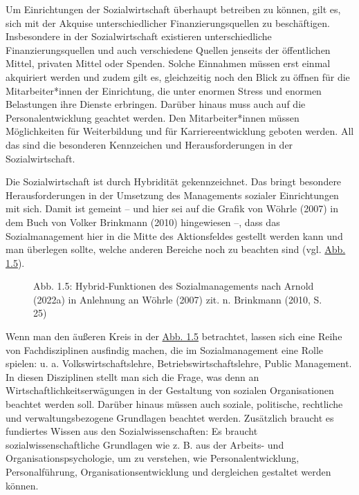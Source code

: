 \documentclass[
  letterpaper,
]{book}
\makeatletter
\newcommand*\pandocbounded[1]{%
  \sbox\pandoc@box{#1}%
  \Gscale@div\@tempa{\textheight}{\dimexpr\ht\pandoc@box+\dp\pandoc@box\relax}%
  \Gscale@div\@tempb{\linewidth}{\wd\pandoc@box}%
  \ifdim\@tempb\p@<\@tempa\p@\let\@tempa\@tempb\fi%
  \ifdim\@tempa\p@<\p@\scalebox{\@tempa}{\usebox\pandoc@box}%
  \else\usebox{\pandoc@box}%
  \fi%
}
\makeatother
\begin{document}
Um Einrichtungen der Sozialwirtschaft überhaupt betreiben zu können,
gilt es, sich mit der Akquise unterschiedlicher Finanzierungsquellen zu
beschäftigen. Insbesondere in der Sozialwirtschaft existieren
unterschiedliche Finanzierungsquellen und auch verschiedene Quellen
jenseits der öffentlichen Mittel, privaten Mittel oder Spenden. Solche
Einnahmen müssen erst einmal akquiriert werden und zudem gilt es,
gleichzeitig noch den Blick zu öffnen für die Mitarbeiter*innen der
Einrichtung, die unter enormen Stress und enormen Belastungen ihre
Dienste erbringen. Darüber hinaus muss auch auf die Personalentwicklung
geachtet werden. Den Mitarbeiter*innen müssen Möglichkeiten für
Weiterbildung und für Karriereentwicklung geboten werden. All das sind
die besonderen Kennzeichen und Herausforderungen in der
Sozialwirtschaft.

Die Sozialwirtschaft ist durch Hybridität gekennzeichnet. Das bringt
besondere Herausforderungen in der Umsetzung des Managements sozialer
Einrichtungen mit sich. Damit ist gemeint -- und hier sei auf die Grafik
von Wöhrle (2007) in dem Buch von Volker Brinkmann (2010) hingewiesen
--, dass das Sozialmanagement hier in die Mitte des Aktionsfeldes
gestellt werden kann und man überlegen sollte, welche anderen Bereiche
noch zu beachten sind (vgl. \hyperref[figure15]{Abb. 1.5}).

\begin{figure}

\pandocbounded{\texttt{[image: images/figure15.png]}} \hfill{}

\caption{Abb. 1.5: Hybrid‐Funktionen des Sozialmanagements nach Arnold
(2022a) in Anlehnung an Wöhrle (2007) zit. n. Brinkmann (2010, S. 25)}

\end{figure}%

Wenn man den äußeren Kreis in der \hyperref[figure15]{Abb. 1.5}
betrachtet, lassen sich eine Reihe von Fachdisziplinen ausfindig machen,
die im Sozialmanagement eine Rolle spielen: u. a. Volkswirtschaftslehre,
Betriebswirtschaftslehre, Public Management. In diesen Disziplinen
stellt man sich die Frage, was denn an Wirtschaftlichkeitserwägungen in
der Gestaltung von sozialen Organisationen beachtet werden soll. Darüber
hinaus müssen auch soziale, politische, rechtliche und
verwaltungsbezogene Grundlagen beachtet werden. Zusätzlich braucht es
fundiertes Wissen aus den Sozialwissenschaften: Es braucht
sozialwissenschaftliche Grundlagen wie z. B. aus der Arbeits- und
Organisationspsychologie, um zu verstehen, wie Personalentwicklung,
Personalführung, Organisationsentwicklung und dergleichen gestaltet
werden können.
\end{document}
